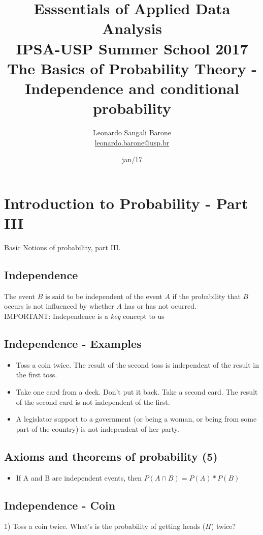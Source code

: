 \documentclass[11pt]{article}
\title{\textbf{Esssentials of Applied Data Analysis\\
				IPSA-USP Summer School 2017}\newline\\
				The Basics of Probability Theory - Independence and conditional probability}
\author{Leonardo Sangali Barone\\ \href{leonardo.barone@usp.br}{leonardo.barone@usp.br}}
\date{jan/17}
\begin{document}
\maketitle

\section*{Introduction to Probability - Part III}

	Basic Notions of probability, part III.

	\subsection*{Independence}
	The event $B$ is said to be independent of the event $A$ if the probability that $B$ occurs is not influenced by whether $A$ has or has not ocurred.\\

	IMPORTANT: Independence is a \emph{key} concept to us	

	\subsection*{Independence - Examples}
	\begin{itemize}
		\item Toss a coin twice. The result of the second toss is independent of the result in the first toss. 
		\item Take one card from a deck. Don't put it back. Take a second card. The result of the second card is not independent of the first.
		\item A legislator support to a government (or being a woman, or being from some part of the country) is not independent of her party.		
	\end{itemize}	



	\subsection*{Axioms and theorems of probability (5)}
	\begin{itemize}
		\item If A and B are independent events, then $P(A \cap B) = P(A) * P(B)$
	\end{itemize}


	\subsection*{Independence - Coin}
	1) Toss a coin twice.
	What's is the probability of getting heads ($H$) twice?
\end{document}
